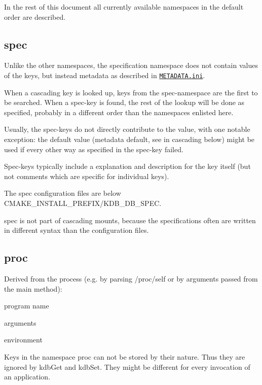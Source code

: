 In the rest of this document all currently available namespaces in the default order are described.

\subsection*{spec}

Unlike the other namespaces, the specification namespace does not contain values of the keys, but instead metadata as described in \href{/home/markus/Projekte/Elektra/current/doc/METADATA.ini}{\tt M\+E\+T\+A\+D\+A\+T\+A.\+ini}.

When a cascading key is looked up, keys from the spec-\/namespace are the first to be searched. When a spec-\/key is found, the rest of the lookup will be done as specified, probably in a different order than the namespaces enlisted here.

Usually, the spec-\/keys do not directly contribute to the value, with one notable exception\+: the default value (metadata {\ttfamily default}, see in cascading below) might be used if every other way as specified in the spec-\/key failed.

Spec-\/keys typically include a explanation and description for the key itself (but not comments which are specific for individual keys).

The spec configuration files are below {\ttfamily C\+M\+A\+K\+E\+\_\+\+I\+N\+S\+T\+A\+L\+L\+\_\+\+P\+R\+E\+F\+I\+X/\+K\+D\+B\+\_\+\+D\+B\+\_\+\+S\+P\+EC}.

spec is not part of cascading mounts, because the specifications often are written in different syntax than the configuration files.

\subsection*{proc}

Derived from the process (e.\+g. by parsing /proc/self or by arguments passed from the main method)\+:


\begin{DoxyItemize}
\item program name
\item arguments
\item environment
\end{DoxyItemize}

Keys in the namespace proc can not be stored by their nature. Thus they are ignored by {\ttfamily kdb\+Get} and {\ttfamily kdb\+Set}. They might be different for every invocation of an application.

